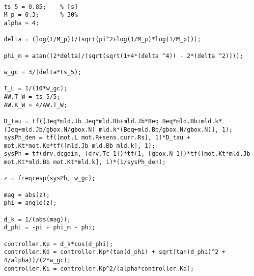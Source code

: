 \begin{lstlisting}[caption={Pid Design Code.}, label={lst:pid_design}]
%% DESIGN OF PID CONTROLLER

ts_5 = 0.85;    % [s]
M_p = 0.3;      % 30%
alpha = 4;

delta = (log(1/M_p))/(sqrt(pi^2+log(1/M_p)*log(1/M_p)));

phi_m = atan((2*delta)/(sqrt(sqrt(1+4*(delta ^4)) - 2*(delta ^2))));

w_gc = 3/(delta*ts_5);

T_L = 1/(10*w_gc);
AW.T_W = ts_5/5;
AW.K_W = 4/AW.T_W;

D_tau = tf([Jeq*mld.Jb Jeq*mld.Bb+mld.Jb*Beq Beq*mld.Bb+mld.k*(Jeq+mld.Jb/gbox.N/gbox.N) mld.k*(Beq+mld.Bb/gbox.N/gbox.N)], 1);
sysPh_den = tf([mot.L mot.R+sens.curr.Rs], 1)*D_tau + mot.Kt*mot.Ke*tf([mld.Jb mld.Bb mld.k], 1);
sysPh = tf(drv.dcgain, [drv.Tc 1])*tf(1, [gbox.N 1])*tf([mot.Kt*mld.Jb mot.Kt*mld.Bb mot.Kt*mld.k], 1)*(1/sysPh_den);

z = freqresp(sysPh, w_gc);

mag = abs(z);
phi = angle(z);

d_k = 1/(abs(mag));
d_phi = -pi + phi_m - phi;

controller.Kp = d_k*cos(d_phi);
controller.Kd = controller.Kp*(tan(d_phi) + sqrt(tan(d_phi)^2 + 4/alpha))/(2*w_gc);
controller.Ki = controller.Kp^2/(alpha*controller.Kd);
\end{lstlisting}
\pagebreak